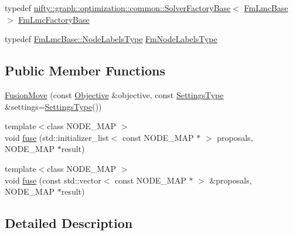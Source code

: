 \begin{DoxyCompactItemize}
typedef \hyperlink{classnifty_1_1graph_1_1optimization_1_1common_1_1SolverFactoryBase}{nifty\+::graph\+::optimization\+::common\+::\+Solver\+Factory\+Base}$<$ \hyperlink{classnifty_1_1graph_1_1optimization_1_1lifted__multicut_1_1FusionMove_a297573c2512b2c29c266affb3f77c8a8}{Fm\+Lmc\+Base} $>$ \hyperlink{classnifty_1_1graph_1_1optimization_1_1lifted__multicut_1_1FusionMove_ab8f8704d7ac394b6af5fba1341cc5a94}{Fm\+Lmc\+Factory\+Base}
\item 
typedef \hyperlink{classnifty_1_1graph_1_1optimization_1_1common_1_1SolverBase_a6e4e465f3b6e039882669fcfb9714818}{Fm\+Lmc\+Base\+::\+Node\+Labels\+Type} \hyperlink{classnifty_1_1graph_1_1optimization_1_1lifted__multicut_1_1FusionMove_a75960ab42a29eff2ad1a8ca0be088a93}{Fm\+Node\+Labels\+Type}
\end{DoxyCompactItemize}
\subsection*{Public Member Functions}
\begin{DoxyCompactItemize}
\item 
\hyperlink{classnifty_1_1graph_1_1optimization_1_1lifted__multicut_1_1FusionMove_ac8e3deeaeee20ea3e3c1e2dfaec569f9}{Fusion\+Move} (const \hyperlink{classnifty_1_1graph_1_1optimization_1_1lifted__multicut_1_1FusionMove_a83ed588b8a2f087185521b5fc73a61a1}{Objective} \&objective, const \hyperlink{structnifty_1_1graph_1_1optimization_1_1lifted__multicut_1_1FusionMove_1_1SettingsType}{Settings\+Type} \&settings=\hyperlink{structnifty_1_1graph_1_1optimization_1_1lifted__multicut_1_1FusionMove_1_1SettingsType}{Settings\+Type}())
\item 
{\footnotesize template$<$class N\+O\+D\+E\+\_\+\+M\+A\+P $>$ }\\void \hyperlink{classnifty_1_1graph_1_1optimization_1_1lifted__multicut_1_1FusionMove_a43c969a14ca6acb6930ac677b6bc252c}{fuse} (std\+::initializer\+\_\+list$<$ const N\+O\+D\+E\+\_\+\+M\+A\+P $\ast$ $>$ proposals, N\+O\+D\+E\+\_\+\+M\+A\+P $\ast$result)
\item 
{\footnotesize template$<$class N\+O\+D\+E\+\_\+\+M\+A\+P $>$ }\\void \hyperlink{classnifty_1_1graph_1_1optimization_1_1lifted__multicut_1_1FusionMove_ac1d5003aa5ec3d5585a351d2c241bba9}{fuse} (const std\+::vector$<$ const N\+O\+D\+E\+\_\+\+M\+A\+P $\ast$ $>$ \&proposals, N\+O\+D\+E\+\_\+\+M\+A\+P $\ast$result)
\end{DoxyCompactItemize}


\subsection{Detailed Description}
